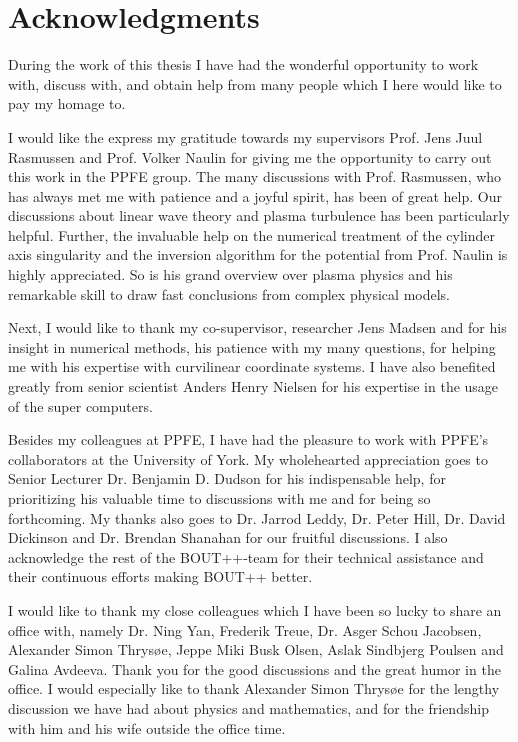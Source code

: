 \chapter*{Acknowledgments}
%
During the work of this thesis I have had the wonderful opportunity to work with, discuss with, and obtain help from many people which I here would like to pay my homage to.

I would like the express my gratitude towards my supervisors Prof. Jens Juul Rasmussen and Prof. Volker Naulin for giving me the opportunity to carry out this work in the PPFE group.
The many discussions with Prof. Rasmussen, who has always met me with patience and a joyful spirit, has been of great help.
Our discussions about linear wave theory and plasma turbulence has been particularly helpful.
Further, the invaluable help on the numerical treatment of the cylinder axis singularity and the inversion algorithm for the potential from Prof. Naulin is highly appreciated.
So is his grand overview over plasma physics and his remarkable skill to draw fast conclusions from complex physical models.

Next, I would like to thank my co-supervisor, researcher Jens Madsen and for his insight in numerical methods, his patience with my many questions, for helping me with his expertise with curvilinear coordinate systems.
I have also benefited greatly from senior scientist Anders Henry Nielsen for his expertise in the usage of the super computers.

Besides my colleagues at PPFE, I have had the pleasure to work with PPFE's collaborators at the University of York.
My wholehearted appreciation goes to Senior Lecturer Dr. Benjamin D. Dudson for his indispensable help, for prioritizing his valuable time to discussions with me and for being so forthcoming.
My thanks also goes to Dr. Jarrod Leddy, Dr. Peter Hill, Dr. David Dickinson and Dr. Brendan Shanahan for our fruitful discussions.
I also acknowledge the rest of the BOUT++-team for their technical assistance and their continuous efforts making BOUT++ better.

I would like to thank my close colleagues which I have been so lucky to share an office with, namely Dr. Ning Yan, Frederik Treue, Dr. Asger Schou Jacobsen, Alexander Simon Thrys{\o}e, Jeppe Miki Busk Olsen, Aslak Sindbjerg Poulsen and Galina Avdeeva. Thank you for the good discussions and the great humor in the office.
I would especially like to thank Alexander Simon Thrys{\o}e for the lengthy discussion we have had about physics and mathematics, and for the friendship with him and his wife outside the office time.

